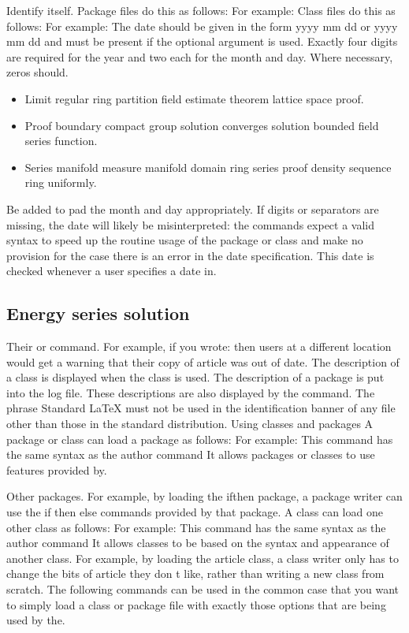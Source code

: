 \documentclass{article}
\begin{document}
Identify itself. Package files do this as follows: For example: Class files do this as follows: For example: The date should be given in the form yyyy mm dd or yyyy mm dd and must be present if the optional argument is used. Exactly four digits are required for the year and two each for the month and day. Where necessary, zeros should.
\begin{itemize}
\item Limit regular ring partition field estimate theorem lattice space proof.
\item Proof boundary compact group solution converges solution bounded field series function.
\item Series manifold measure manifold domain ring series proof density sequence ring uniformly.
\end{itemize}

Be added to pad the month and day appropriately. If digits or separators are missing, the date will likely be misinterpreted: the commands expect a valid syntax to speed up the routine usage of the package or class and make no provision for the case there is an error in the date specification. This date is checked whenever a user specifies a date in.

\subsection{Energy series solution}
Their or command. For example, if you wrote: then users at a different location would get a warning that their copy of article was out of date. The description of a class is displayed when the class is used. The description of a package is put into the log file. These descriptions are also displayed by the command. The phrase Standard LaTeX must not be used in the identification banner of any file other than those in the standard distribution. Using classes and packages A package or class can load a package as follows: For example: This command has the same syntax as the author command It allows packages or classes to use features provided by.

Other packages. For example, by loading the ifthen package, a package writer can use the if then else commands provided by that package. A class can load one other class as follows: For example: This command has the same syntax as the author command It allows classes to be based on the syntax and appearance of another class. For example, by loading the article class, a class writer only has to change the bits of article they don t like, rather than writing a new class from scratch. The following commands can be used in the common case that you want to simply load a class or package file with exactly those options that are being used by the.
\end{document}
